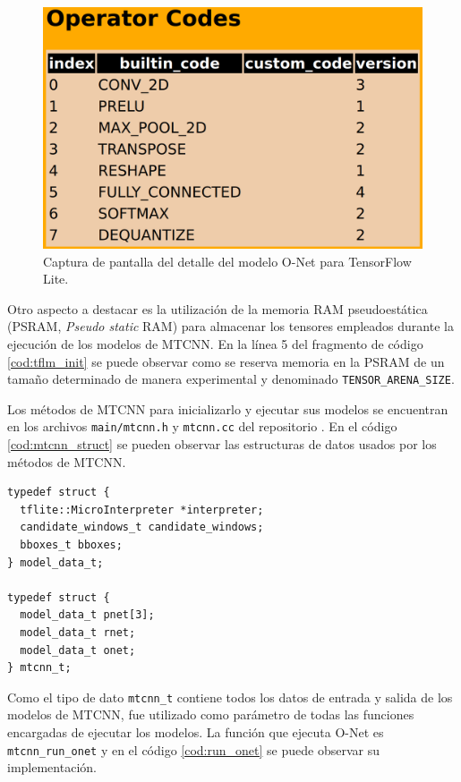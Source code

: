 \begin{figure}[h]
	\centering
	\includegraphics[scale=0.15]{./Figures/fw_tflite_ops.png}
	\caption{Captura de pantalla del detalle del modelo O-Net para TensorFlow Lite.}
	\label{fig:fw_tflite_ops}
\end{figure}

Otro aspecto a destacar es la utilización de la memoria RAM pseudoestática (PSRAM, \textit{Pseudo static} RAM) para almacenar los tensores empleados durante la ejecución de los modelos de MTCNN. En la línea 5 del fragmento de código \ref{cod:tflm_init} se puede observar como se reserva memoria en la PSRAM de un tamaño determinado de manera experimental y denominado \texttt{TENSOR\_ARENA\_SIZE}.

Los métodos de MTCNN para inicializarlo y ejecutar sus modelos se encuentran en los archivos \texttt{main/mtcnn.h} y \texttt{mtcnn.cc} del repositorio \cite{mtcnn_repo}. En el código \ref{cod:mtcnn_struct} se pueden observar las estructuras de datos usados por los métodos de MTCNN.

\begin{lstlisting}[label=cod:mtcnn_struct,caption=Estructura de datos de MTCNN.]
typedef struct {
  tflite::MicroInterpreter *interpreter;
  candidate_windows_t candidate_windows;
  bboxes_t bboxes;
} model_data_t;

typedef struct {
  model_data_t pnet[3];
  model_data_t rnet;
  model_data_t onet;
} mtcnn_t;
\end{lstlisting}

Como el tipo de dato \texttt{mtcnn\_t} contiene todos los datos de entrada y salida de los modelos de MTCNN, fue utilizado como parámetro de todas las funciones encargadas de ejecutar los modelos. La función que ejecuta O-Net es \texttt{mtcnn\_run\_onet} y en el código \ref{cod:run_onet} se puede observar su implementación.

